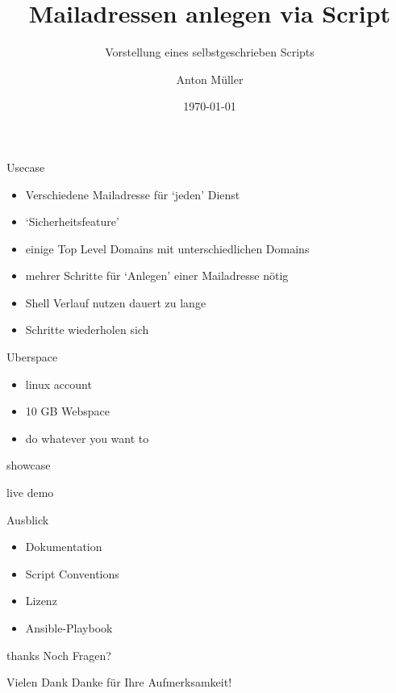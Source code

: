 \documentclass{beamer}
\title{Mailadressen anlegen via Script}
\subtitle{Vorstellung eines selbstgeschrieben Scripts}
\author{Anton Müller}
\institute{Vorstellungsgespräch bei der\\T-System Multi Media Solutions}
\date{\today}
\begin{document}
    \begin{frame}
        \maketitle
    \end{frame}
    
   \begin{frame}{Usecase}
   	\protect\hypertarget{usecase}{}
   	
   	\begin{itemize}
          \item
  	    Verschiedene Mailadresse für `jeden' Dienst
  	 \item
  	   `Sicherheitsfeature'
  	 \item
  	   einige Top Level Domains mit unterschiedlichen Domains
  	 \item
  	   mehrer Schritte für `Anlegen' einer Mailadresse nötig
  	 \item
  	   Shell Verlauf nutzen dauert zu lange
  	 \item
  	   Schritte wiederholen sich
   	\end{itemize}
   
   \end{frame}
   
   \begin{frame}{Uberspace}
   	\protect\hypertarget{uberspace}{}
   	
   	\begin{itemize}
   	  \item
   	    linux account
   	  \item
   	    10 GB Webspace
   	  \item
   	    do whatever you want to
   	\end{itemize}
   	
   \end{frame}
   
   \begin{frame}{showcase}
   \protect\hypertarget{showcase}{}
   
   \begin{block}{live demo}
   
   \end{block}
   
   \end{frame}
   
   \begin{frame}{Ausblick}
   	\begin{itemize}
   	  \item
   	   Dokumentation
   	  \item
   	   Script Conventions
   	  \item
   	   Lizenz
   	  \item
   	   Ansible-Playbook
   	\end{itemize}
   \end{frame}
   
   
   \begin{frame}[focus]{thanks}
   	Noch Fragen? 
   \end{frame}

   \begin{frame}[focus]{Vielen Dank}
	    Danke für Ihre Aufmerksamkeit!
   \end{frame}
    
\end{document}
